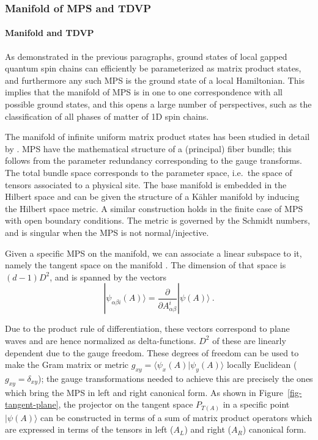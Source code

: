 \documentclass[rmp,aps,reprint,superscriptaddress,nobalancelastpage]{revtex4-1}
\begin{document}
\subsubsection{Manifold of MPS and TDVP}

\paragraph{Manifold and TDVP}
As demonstrated in the previous paragraphs, ground states of local gapped quantum spin chains can efficiently be parameterized as matrix product states, and furthermore any such MPS is the ground state of a local Hamiltonian. This implies that the manifold of MPS is in one to one correspondence with all possible ground states, and this opens a large number of perspectives, such as the classification of all phases of matter of 1D spin chains.

The manifold of infinite uniform matrix product states has been studied in detail by \citet{haegeman2014geometry}. MPS have the mathematical structure of a (principal) fiber bundle; this follows from the parameter redundancy corresponding to the gauge transforms. The total bundle space corresponds to the parameter space, i.e.\ the space of tensors associated to a physical site. The base manifold is embedded in the Hilbert space and can be given the structure of a K\"ahler manifold by inducing the Hilbert space metric. A similar construction holds in the finite case of MPS with open boundary conditions. The metric is governed by the Schmidt numbers, and is singular when the MPS is not normal/injective.

Given a specific MPS on the manifold, we can associate a linear subspace to it, namely the tangent space on the manifold \cite{haegeman:varprinciple-lattices,vanderstraeten2018tangent}. The dimension of that space is $(d-1)D^2$, and is spanned by the vectors
\[
    |\psi_{\alpha\beta i}(A)\rangle=\frac{\partial}{\partial A^i_{\alpha\beta}}|\psi(A)\rangle
    \ .
\]

Due to the product rule of differentiation, these vectors correspond to plane waves and are hence normalized as delta-functions.  $D^2$ of these are linearly dependent due to the gauge freedom.  These degrees of freedom can be used to make the Gram matrix or metric $g_{xy}=\langle\psi_x(A)|\psi_y(A)\rangle$ locally Euclidean ($g_{xy}=\delta_{xy}$); the gauge transformations needed to achieve this are precisely the ones which bring the MPS in left and right canonical form.
As shown in Figure~\ref{fig-tangent-plane}, the projector on the tangent space $P_{T(A)}$ in a specific point $|\psi(A)\rangle$ can be constructed in terms of a sum of matrix product operators which are expressed in terms of the tensors in left ($A_L$) and right ($A_R$) canonical form.
\end{document}
